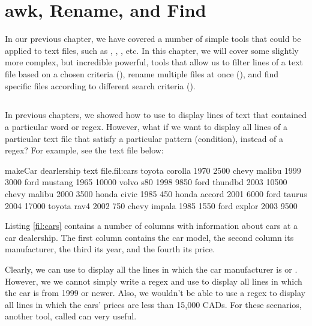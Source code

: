 \chapter{awk, Rename, and Find}\label{ch:awk}

In our previous chapter, we have covered a number of simple tools that could be applied to text files, such as , , , etc. In this chapter, we will cover some slightly more complex, but incredible powerful, tools that allow us to filter lines of a text file based on a chosen criteria (), rename multiple files at once (), and find specific files according to different search criteria ().

\section{}

In previous chapters, we showed how to use  to display lines of text that contained a particular word or \acs{regex}. However, what if we want to display all lines of a particular text file that satisfy a particular pattern (condition), instead of a \acs{regex}? For example, see the text file below:

\begin{command_line_float}{make}{Car dearlership text file.}{fil:cars}
toyota corolla 1970 2500
chevy malibu 1999 3000
ford mustang 1965 10000
volvo s80 1998 9850
ford thundbd 2003 10500
chevy malibu 2000 3500
honda civic 1985 450
honda accord 2001 6000
ford taurus 2004 17000
toyota rav4 2002 750
chevy impala 1985 1550
ford explor 2003 9500
\end{command_line_float}

Listing \ref{fil:cars} contains a number of columns with information about cars at a car dealership. The first column contains the car model, the second column its manufacturer, the third its year, and the fourth its price.

Clearly, we can use  to display all the lines in which the car manufacturer is  or . However, we we cannot simply write a \acs{regex} and use  to display all lines in which the car is from 1999 or newer. Also, we wouldn't be able to use a \acs{regex} to display all lines in which the cars' prices are less than 15,000 CADs. For these scenarios, another tool, called  can very useful.

